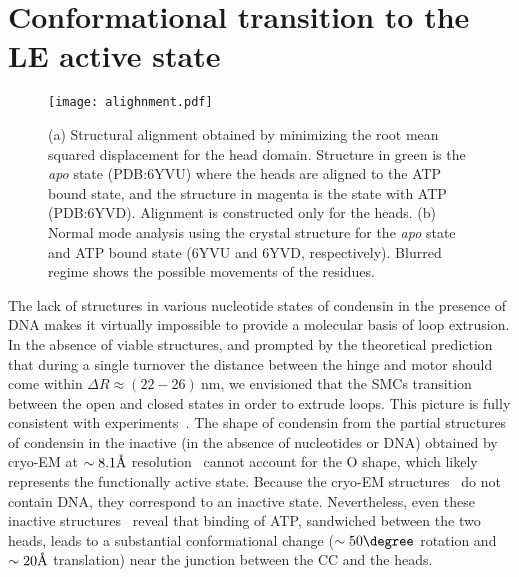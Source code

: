\documentclass[aps,preprint]{revtex4-1}
\newcommand{\angstrom}{\textup{\AA}}
\newcommand{\nm}{\ \mathrm{nm}}
\newcommand{\bp}{\ \mathrm{bp}}
\newcommand{\persec}{\ \mathrm{s}^{-1}}
\begin{document}


\section{Conformational transition to the LE active state}
\begin{figure}[]
\centering
\texttt{[image: alighnment.pdf]}
\caption{\label{fig:alighn} (a) Structural alignment obtained by minimizing the root mean squared displacement for the head domain. Structure in green is the {\it apo} state (PDB:6YVU) where the heads are aligned to the ATP bound state, and the structure in magenta is the state with ATP (PDB:6YVD). 
Alignment is constructed only for the heads. (b) Normal mode analysis using the crystal structure for the {\it apo} state and ATP bound state (6YVU and 6YVD, respectively). Blurred regime shows the possible movements of the residues.  
}
\end{figure}
The lack of structures in various nucleotide states of condensin in the presence of DNA makes it virtually impossible to provide a molecular basis of loop extrusion. In the absence of viable structures, and prompted by the theoretical prediction that during a single turnover the distance between the hinge and motor should come within $\Delta R \approx (22-26) \nm$, we envisioned that the SMCs transition between the open and closed states in order to extrude loops. This picture is fully consistent with experiments~\cite{ryu2020condensin}. The shape of condensin from the partial structures of condensin in the inactive (in the absence of nucleotides or DNA) obtained by cryo-EM at $\sim 8.1 \angstrom$ resolution~\cite{lee2020cryo} cannot account for the O shape, which likely represents the functionally active state. Because the cryo-EM structures~\cite{lee2020cryo} do not contain DNA, they correspond to an inactive state.  Nevertheless, even these inactive structures~\cite{lee2020cryo} reveal that binding of ATP,  sandwiched between the two heads, leads to a substantial conformational change ($\sim 50 \degree$ rotation and $\sim 20 \angstrom$ translation) near the junction between the CC and the heads.
\end{document}
